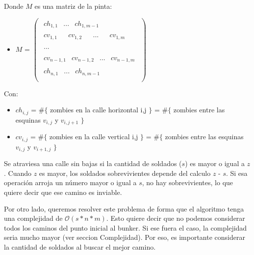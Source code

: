 Donde $M$ es una matriz de la pinta:
\begin{itemize}[]
    \item $M$ =
      $
      \begin{pmatrix}
      \begin{matrix} ch_{1,1} & ... & ch_{1,m-1} \end{matrix}\\
      \begin{matrix} cv_{1,1} & & cv_{1,2} & & ... & & cv_{1,m} \end{matrix}\\
      \begin{matrix} ... \end{matrix}\\
      \begin{matrix} cv_{n-1,1} & cv_{n-1,2} & ... & cv_{n-1,m} \end{matrix}\\
      \begin{matrix} ch_{n,1} & ... & ch_{n,m-1} \end{matrix}\\
      \end{pmatrix}
      $
\end{itemize}

Con:
\begin{itemize}[]
  \item $ch_{i,j}$ = \#$\lbrace$ zombies en la calle horizontal i,j $\rbrace$ = \#$\lbrace$ zombies entre las esquinas $v_{i,j}$ y $v_{i,j+1}$ $\rbrace$
  \item $cv_{i,j}$ = \#$\lbrace$ zombies en la calle vertical i,j $\rbrace$ = \#$\lbrace$ zombies entre las esquinas $v_{i,j}$ y $v_{i+1,j}$ $\rbrace$
\end{itemize}

Se atraviesa una calle sin bajas si la cantidad de soldados ($s$) es mayor o igual a $z$. Cuando $z$ es mayor, los soldados sobrevivientes depende del calculo $z$ - $s$. Si esa operación arroja un número mayor o igual a $s$, no hay sobrevivientes, lo que quiere decir que ese camino es inviable.

Por otro lado, queremos resolver este problema de forma que el algoritmo tenga una complejidad de $\mathcal{O}(s*n*m)$. Esto quiere decir que no podemos considerar todos los caminos del punto inicial al bunker. Si ese fuera el caso, la complejidad seria mucho mayor (ver seccion Complejidad). Por eso, es importante considerar la cantidad de soldados al buscar el mejor camino.

